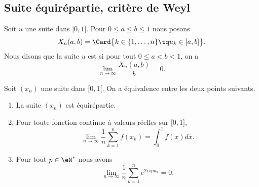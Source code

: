 \subsection{Suite équirépartie, critère de Weyl}

\begin{definition}
    Soit \( u\) une suite dans \( \mathopen[ 0 , 1 \mathclose]\). Pour \( 0\leq a\leq b\leq 1\) nous posons
    \begin{equation}
        X_n(a,b)=\Card\big\{  k\in\{ 1,\ldots, n \}\tq u_k\in\mathopen[ a , b \mathclose] \big\}.
    \end{equation}
    Nous disons que la suite \( u\) est  si pour tout \( 0\leq a<b<1\), on a
    \begin{equation}
        \lim_{n\to \infty} \frac{ X_n(a,b) }{ b }=0.
    \end{equation}
\end{definition}

\begin{proposition}  \label{PropDMvPDc}
    Soit \( (x_n)\) une suite dans \( \mathopen[ 0 , 1 [\). On a équivalence entre les deux points suivants.
    \begin{enumerate}
        \item   \label{ItemKWcZTHqi}
            La suite \( (x_n)\) est équirépartie.
        \item\label{ItemKWcZTHqii}
            Pour toute fonction continue à valeurs réelles sur \( \mathopen[ 0 , 1 \mathclose]\),
            \begin{equation}    \label{EqBSqdjpn}
                \lim_{n\to \infty} \frac{1}{ n }\sum_{k=1}^nf(x_k)=\int_0^1f(x)dx.
            \end{equation}
        \item\label{ItemKWcZTHqiii}
            Pour tout \( p\in\eN^*\) nous avons
            \begin{equation}
                \lim_{n\to \infty} \frac{1}{ n }\sum_{k=1}^n e^{2i\pi pu_k}=0.
            \end{equation}
    \end{enumerate}
\end{proposition}

